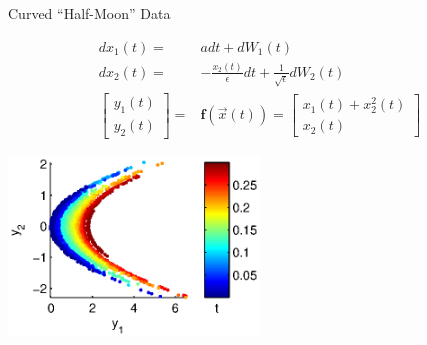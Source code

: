 \documentclass[12pt]{beamer}
\begin{document}
\begin{frame}{Curved ``Half-Moon'' Data}

\begin{block}{}
\begin{equation*}
\begin{aligned}
dx_1(t) =& adt + dW_1(t)\\
dx_2(t) =& -\frac{x_2(t)}{\epsilon} dt + \frac{1}{\sqrt{\epsilon}} dW_2(t)\\
\begin{bmatrix}
y_1(t) \\ y_2(t)
\end{bmatrix} =&
\mathbf{f}(\vec{x}(t)) =
\begin{bmatrix}
x_1(t) + x_2^2(t) \\
x_2(t)
\end{bmatrix}
\end{aligned}
\end{equation*}
\end{block}

\centering
\includegraphics[width=0.5\textwidth]{data_init_nonlinear}

\end{frame}
\end{document}

